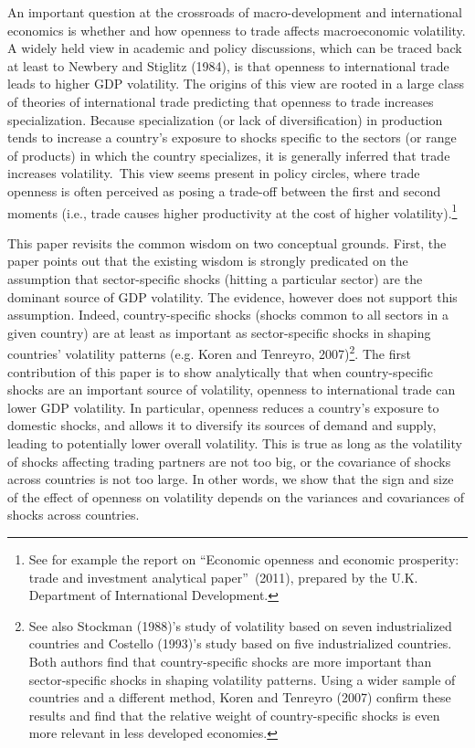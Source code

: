 \documentclass[12pt]{article}
\begin{document}
An important question at the crossroads of macro-development and
international economics is whether and how openness to trade affects
macroeconomic volatility. A widely held view in academic and policy
discussions, which can be traced back at least to Newbery and Stiglitz
(1984), is that openness to international trade leads to higher GDP
volatility. The origins of this view are rooted in a large class of theories
of international trade predicting that openness to trade increases
specialization. Because specialization (or lack of diversification) in
production tends to increase a country's exposure to shocks specific to the
sectors (or range of products) in which the country specializes, it is
generally inferred that trade increases volatility.\ This view seems present
in policy circles, where trade openness is often perceived as posing a
trade-off between the first and second moments (i.e., trade causes higher
productivity at the cost of higher volatility).\footnote{%
See for example the report on \textquotedblleft Economic openness and
economic prosperity: trade and investment analytical
paper\textquotedblright\ (2011), prepared by the U.K. Department of
International Development.}

This paper revisits the common wisdom on two conceptual grounds. First, the
paper points out that the existing wisdom is strongly predicated on the
assumption that sector-specific shocks (hitting a particular sector) are the
dominant source of GDP volatility. The evidence, however does not support
this assumption. Indeed, country-specific shocks (shocks common to all
sectors in a given country) are at least as important as sector-specific
shocks in shaping countries' volatility patterns (e.g. Koren and Tenreyro,
2007)\footnote{%
See also Stockman (1988)'s study of volatility based on seven industrialized
countries and Costello (1993)'s study based on five industrialized
countries. Both authors find that country-specific shocks are more important
than sector-specific shocks in shaping volatility patterns. Using a wider
sample of countries and a different method, Koren and Tenreyro (2007)
confirm these results and find that the relative weight of country-specific
shocks is even more relevant in less developed economies.}. The first
contribution of this paper is to show analytically that when
country-specific shocks are an important source of volatility, openness to
international trade can lower GDP volatility. In particular, openness
reduces a country's exposure to domestic shocks, and allows it to diversify
its sources of demand and supply, leading to potentially lower overall
volatility. This is true as long as the volatility of shocks affecting
trading partners are not too big, or the covariance of shocks across
countries is not too large. In other words, we show that the sign and size
of the effect of openness on volatility depends on the variances and
covariances of shocks across countries.
\end{document}
